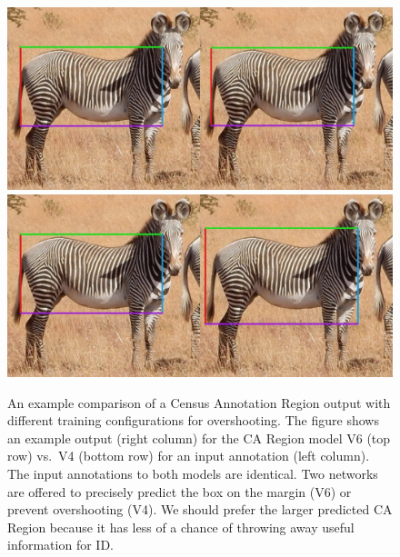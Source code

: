 \begin{figure}[!t]
    \begin{center}
        \includegraphics[width=0.70\linewidth]{resources/ca-canonical-regression-iou-96-aid-11470.pdf}
        \\
        \includegraphics[width=0.70\linewidth]{resources/ca-canonical-regression-iou-76-aid-11470.pdf}
    \end{center}
    \caption{An example comparison of a Census Annotation Region output with different training configurations for overshooting.  The figure shows an example output (right column) for the CA Region model V6 (top row) vs.\ V4 (bottom row) for an input annotation (left column).  The input annotations to both models are identical.  Two networks are offered to precisely predict the box on the margin (V6) or prevent overshooting (V4).  We should prefer the larger predicted CA Region because it has less of a chance of throwing away useful information for ID.}
    \label{fig:ca-iou}
\end{figure}

